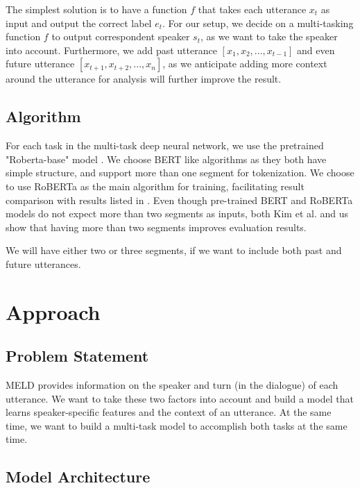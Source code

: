 \documentclass[11pt]{article}
\begin{document}
The simplest solution is to have a function $f$ that takes each utterance $x_t$ as input and output the correct label $e_t$. For our setup, we decide on a multi-tasking function $f$ to output correspondent speaker $s_t$, as we want to take the speaker into account. Furthermore, we add past utterance $[x_1, x_2, ..., x_{t-1}]$ and even future utterance $[x_{t+1}, x_{t+2}, ..., x_n]$, as we anticipate adding more context around the utterance for analysis will further improve the result.


\subsection{Algorithm}

For each task in the multi-task deep neural network, we use the pretrained "Roberta-base" model \citet{liu-etal-2019-multi}. We choose BERT like algorithms as they both have simple structure, and support more than one segment for tokenization. We choose to use RoBERTa as the main algorithm for training, facilitating result comparison with results listed in \citet{kim-2021-emoberta}. Even though pre-trained BERT and RoBERTa models do not expect more than two segments as inputs, both Kim et al. and us show that having more than two segments improves evaluation results.

We will have either two or three segments, if we want to include both past and future utterances.


\section{Approach}
\label{sec:approach}

\subsection{Problem Statement}
MELD provides information on the speaker and turn (in the dialogue) of each utterance. We want to take these two factors into account and build a model that learns speaker-specific features and the context of an utterance. At the same time, we want to build a multi-task model to accomplish both tasks at the same time.


\subsection{Model Architecture}
\end{document}

